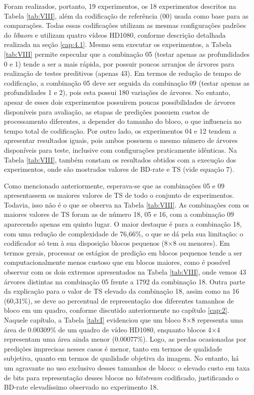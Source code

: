 Foram realizados, portanto, 19 experimentos, os 18 experimentos descritos na Tabela \ref{tab:VIII}, além da codificação de referência (00) usada como base para as comparações. Todas essas codificações utilizam as mesmas configurações padrões do \textit{libaom} e utilizam quatro vídeos HD1080, conforme descrição detalhada realizada na seção \ref{cap:4.1}. Mesmo sem executar os experimentos, a Tabela \ref{tab:VIII} permite especular que a combinação 05 (testar apenas as profundidades 0 e 1) tende a ser a mais rápida, por possuir poucos arranjos de árvores para realização de testes preditivos (apenas 43). Em termos de redução de tempo de codificação, a combinação 05 deve ser seguida da combinação 09 (testar apenas as profundidades 1 e 2), pois esta possui 180 variações de árvores. No entanto, apesar de esses dois experimentos possuírem poucas possibilidades de árvores disponíveis para avaliação, as etapas de predições possuem custos de processamento diferentes, a depender do tamanho do bloco, o que influencia no tempo total de codificação. Por outro lado, os experimentos 04 e 12 tendem a apresentar resultados iguais, pois ambos possuem o mesmo número de árvores disponíveis para teste, inclusive com configurações praticamente idênticas. Na Tabela \ref{tab:VIII}, também constam os resultados obtidos com a execução dos experimentos, onde são mostrados valores de BD-rate e TS (vide equação 7).

Como mencionado anteriormente, esperava-se que as combinações 05 e 09 apresentassem os maiores valores de TS de todo o conjunto de experimentos. Todavia, isso não é o que se observa na Tabela \ref{tab:VIII}. As combinações com os maiores valores de TS foram as de número 18, 05 e 16, com a combinação 09 aparecendo apenas em quinto lugar. O maior destaque é para a combinação 18, com uma redução de complexidade de 76,66\%, o que se dá pela sua limitação: o codificador só tem à sua disposição blocos pequenos (8$\times$8 ou menores). Em termos gerais, processar os estágios de predição em blocos pequenos tende a ser computacionalmente menos custoso que em blocos maiores, como é possível observar com os dois extremos apresentados na Tabela \ref{tab:VIII}, onde vemos 43 árvores distintas na combinação 05 frente a 1792 da combinação 18. Outra parte da explicação para o valor de TS elevado da combinação 18, assim como na 16 (60,31\%), se deve ao percentual de representação dos diferentes tamanhos de bloco em um quadro, conforme discutido anteriormente no capítulo \ref{cap:2}. Naquele capítulo, a Tabela \ref{tab:I} evidenciou que um bloco 8$\times$8 representa uma área de 0.00309\% de um quadro de vídeo HD1080, enquanto blocos 4$\times$4 representam uma área ainda menor (0.00077\%). Logo, as perdas ocasionadas por predições imprecisas nesses casos é menor, tanto em termos de qualidade subjetiva, quanto em termos de qualidade objetiva da imagem. No entanto, há um agravante no uso exclusivo desses tamanhos de bloco: o elevado custo em taxa de bits para representação desses blocos no \textit{bitstream} codificado, justificando o BD-rate elevadíssimo observado no experimento 18.

